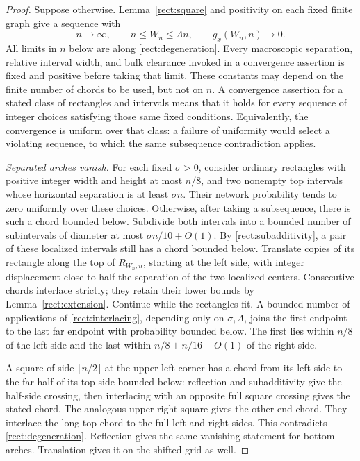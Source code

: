 \begin{proof}
Suppose otherwise.  Lemma~\ref{rect:square} and positivity on each
fixed finite graph give a sequence with
\begin{equation}
 n\longrightarrow\infty,\qquad n\le W_n\le\Lambda n,
 \qquad g_x(W_n,n)\longrightarrow0.
 \label{rect:degeneration}
\end{equation}
All limits in $n$ below are along \eqref{rect:degeneration}. Every
macroscopic separation, relative interval width, and bulk clearance
invoked in a convergence assertion is fixed and positive before taking
that limit. These constants may depend
on the finite number of chords to be used, but not on $n$. A convergence
assertion for a stated class of rectangles and intervals means that it
holds for every sequence of integer choices satisfying those same fixed
conditions. Equivalently, the convergence is uniform over that class:
a failure of uniformity would select a violating sequence, to which
the same subsequence contradiction applies.

\smallskip\noindent
\emph{Separated arches vanish.}
For each fixed $\sigma>0$, consider ordinary rectangles with positive
integer width and height at most $n/8$, and two nonempty top intervals
whose horizontal separation is at least $\sigma n$. Their network
probability tends to zero uniformly over these choices. Otherwise, after taking a
subsequence, there is such a chord bounded below.  Subdivide both
intervals into a bounded number of subintervals of diameter at most
$\sigma n/10+O(1)$.  By \eqref{rect:subadditivity}, a pair of these localized
intervals still has a chord bounded below.  Translate copies of its
rectangle along the top of $R_{W_n,n}$, starting at the left side, with
integer displacement close to half the separation of the two localized
centers.  Consecutive chords interlace strictly; they retain their lower
bounds by Lemma~\ref{rect:extension}.  Continue while the rectangles
fit.  A bounded number of applications of
\eqref{rect:interlacing}, depending only on $\sigma,\Lambda$, joins the
first endpoint to the last far endpoint with probability bounded below.
The first lies within $n/8$ of the left side and the last within
$n/8+n/16+O(1)$ of the right side.

A square of side $\lfloor n/2\rfloor$ at the upper-left corner has a
chord from its left side to the far half of its top side bounded below:
reflection and subadditivity give the half-side crossing, then
interlacing with an opposite full square crossing gives the stated
chord.  The analogous upper-right square gives the other end chord.
They interlace the long top chord to the full left and right sides.
This contradicts \eqref{rect:degeneration}.  Reflection gives the same
vanishing statement for bottom arches.  Translation gives it on the
shifted grid as well.


\end{proof}
